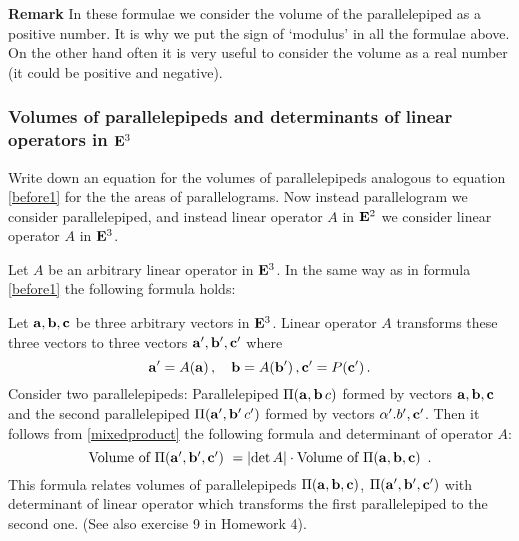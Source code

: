\documentclass[12pt]{article}
\numberwithin{equation}{section}
\begin{document}
{\footnotesize {\bf Remark} In these 
formulae
we consider the volume of the parallelepiped as a positive number.
It is why we put the sign of `modulus' in all the formulae above.
On the other hand often it is very useful to consider the volume as a real number
  (it could be positive and negative).




}


\subsubsection {Volumes of parallelepipeds
and determinants of linear operators in ${\bf E}^3$}
 Write down an equation for the volumes of parallelepipeds
analogous to equation \eqref{before1}
for the the areas of parallelograms. 
Now 
instead parallelogram we consider parallelepiped,
and instead linear operator $A$ in ${\bf E}^2$
we consider linear operator $A$ in ${\bf E}^3$.  


  Let $A$ be an arbitrary linear operator in ${\bf E}^3$.
In the same way as in formula \eqref{before1}
the following formula holds:

 Let ${\bf a},{\bf b},{\bf c}$ be three arbitrary vectors in
  ${\bf E}^3$.  Linear operator $A$ transforms these three vectors
to three vectors ${\bf a}',{\bf b}',{\bf c}'$ where
                   \begin{equation*}
       {\bf a}'=A({\bf a})\,,\quad{\bf b}=A({\bf b}')\,, {\bf c}'=P({\bf c}')\,.
                    \end{equation*}
Consider two parallelepipeds:
   Parallelepiped $\Pi({\bf a},{\bf b}\,c)$ formed by vectors ${\bf a},{\bf b},{\bf c}$
and the second parallelepiped $\Pi({\bf a}',{\bf b}'\,c')$ 
formed by vectors $\alpha'.b',{\bf c}'$.  Then
it follows from \eqref{mixedproduct} the following formula
and determinant of operator $A$:
                 \begin{equation}\label{before2}
         \hbox{Volume of $\Pi({\bf a}',{\bf b}',{\bf c}')$ }=
         \left|
                \det A\right|\cdot\hbox{Volume of $\Pi({\bf a},{\bf b},{\bf c})$ }
                      \,.
                     \end{equation}
This formula relates volumes of parallelepipeds
  $\Pi({\bf a},{\bf b},{\bf c})$, $\Pi({\bf a}',{\bf b}',{\bf c}')$ with determinant of linear operator
 which transforms the first parallelepiped to the second one.
 (See also exercise 9 in Homework 4).
\end{document}
